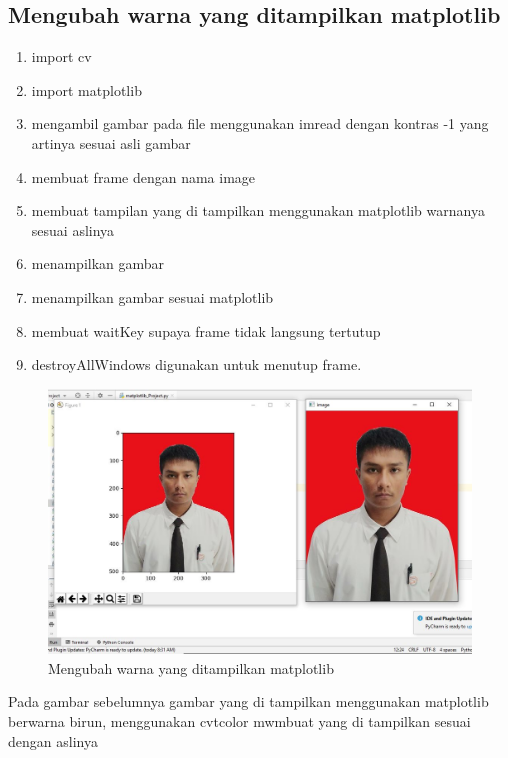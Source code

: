 \subsection{Mengubah warna yang ditampilkan matplotlib}

\begin{enumerate}
	\item import cv
	\item import matplotlib
	\item mengambil gambar pada file menggunakan imread dengan kontras -1 yang artinya sesuai asli gambar
	\item membuat frame dengan nama image
	\item membuat tampilan yang di tampilkan menggunakan matplotlib warnanya sesuai aslinya
	\item menampilkan gambar
	\item menampilkan gambar sesuai matplotlib
	\item membuat waitKey supaya frame tidak langsung tertutup
	\item destroyAllWindows digunakan untuk menutup frame.
\end{enumerate}

\newpage
\begin{figure}[ht]
\centering
\includegraphics[scale=0.42]{figures/2,47.jpg}
\caption{Mengubah warna yang ditampilkan matplotlib}
\label{contoh}
\end{figure}
Pada gambar sebelumnya gambar yang di tampilkan menggunakan matplotlib berwarna birun, menggunakan cvtcolor mwmbuat yang di tampilkan sesuai dengan aslinya

